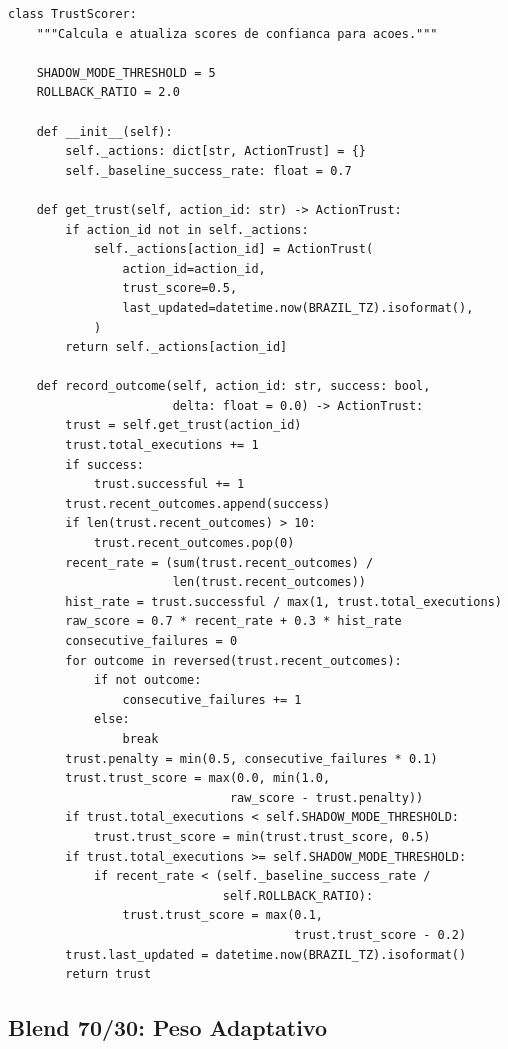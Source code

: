 \begin{lstlisting}[style=pythonstyle, caption={TrustScorer: calculo do score de confianca (trust\_engine.py:78-176)}]
class TrustScorer:
    """Calcula e atualiza scores de confianca para acoes."""

    SHADOW_MODE_THRESHOLD = 5
    ROLLBACK_RATIO = 2.0

    def __init__(self):
        self._actions: dict[str, ActionTrust] = {}
        self._baseline_success_rate: float = 0.7

    def get_trust(self, action_id: str) -> ActionTrust:
        if action_id not in self._actions:
            self._actions[action_id] = ActionTrust(
                action_id=action_id,
                trust_score=0.5,
                last_updated=datetime.now(BRAZIL_TZ).isoformat(),
            )
        return self._actions[action_id]

    def record_outcome(self, action_id: str, success: bool,
                       delta: float = 0.0) -> ActionTrust:
        trust = self.get_trust(action_id)
        trust.total_executions += 1
        if success:
            trust.successful += 1
        trust.recent_outcomes.append(success)
        if len(trust.recent_outcomes) > 10:
            trust.recent_outcomes.pop(0)
        recent_rate = (sum(trust.recent_outcomes) /
                       len(trust.recent_outcomes))
        hist_rate = trust.successful / max(1, trust.total_executions)
        raw_score = 0.7 * recent_rate + 0.3 * hist_rate
        consecutive_failures = 0
        for outcome in reversed(trust.recent_outcomes):
            if not outcome:
                consecutive_failures += 1
            else:
                break
        trust.penalty = min(0.5, consecutive_failures * 0.1)
        trust.trust_score = max(0.0, min(1.0,
                               raw_score - trust.penalty))
        if trust.total_executions < self.SHADOW_MODE_THRESHOLD:
            trust.trust_score = min(trust.trust_score, 0.5)
        if trust.total_executions >= self.SHADOW_MODE_THRESHOLD:
            if recent_rate < (self._baseline_success_rate /
                              self.ROLLBACK_RATIO):
                trust.trust_score = max(0.1,
                                        trust.trust_score - 0.2)
        trust.last_updated = datetime.now(BRAZIL_TZ).isoformat()
        return trust
\end{lstlisting}

\subsection{Blend 70/30: Peso Adaptativo}

